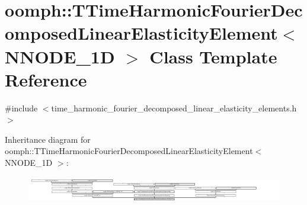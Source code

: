 \hypertarget{classoomph_1_1TTimeHarmonicFourierDecomposedLinearElasticityElement}{}\section{oomph\+:\+:T\+Time\+Harmonic\+Fourier\+Decomposed\+Linear\+Elasticity\+Element$<$ N\+N\+O\+D\+E\+\_\+1D $>$ Class Template Reference}
\label{classoomph_1_1TTimeHarmonicFourierDecomposedLinearElasticityElement}


{\ttfamily \#include $<$time\+\_\+harmonic\+\_\+fourier\+\_\+decomposed\+\_\+linear\+\_\+elasticity\+\_\+elements.\+h$>$}

Inheritance diagram for oomph\+:\+:T\+Time\+Harmonic\+Fourier\+Decomposed\+Linear\+Elasticity\+Element$<$ N\+N\+O\+D\+E\+\_\+1D $>$\+:\begin{figure}[H]
\begin{center}
\leavevmode
\includegraphics[height=1.149897cm]{classoomph_1_1TTimeHarmonicFourierDecomposedLinearElasticityElement}
\end{center}
\end{figure}
